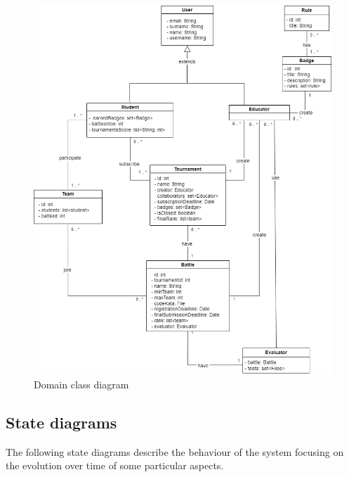 \begin{figure}[H]
    \centering
    \includegraphics[scale=0.5]{images/class_diagram.png}
    \caption{Domain class diagram}
    \label{fig:class_diagram}
\end{figure}
\clearpage

\subsection{State diagrams}
The following state diagrams describe the behaviour of the system focusing on the evolution over time of some particular aspects. 

